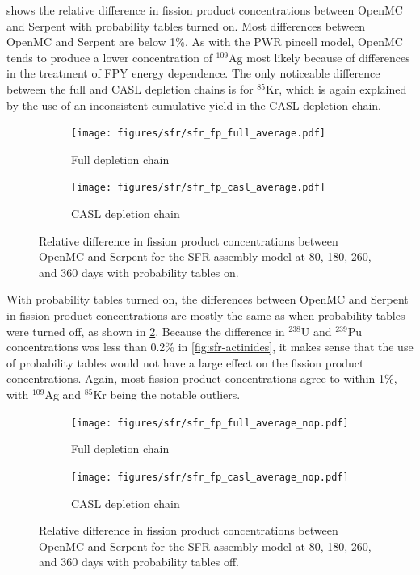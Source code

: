 \documentclass[3p,authoryear]{elsarticle}
\begin{document}
 shows the relative difference in fission product
concentrations between OpenMC and Serpent with probability tables turned on.
Most differences between OpenMC and Serpent are below 1\%. As with the PWR
pincell model, OpenMC tends to produce a lower concentration of $^{109}$Ag most
likely because of differences in the treatment of FPY energy dependence. The
only noticeable difference between the full and CASL depletion chains is for
$^{85}$Kr, which is again explained by the use of an inconsistent cumulative
yield in the CASL depletion chain.
\begin{figure}[H]
  \centering
  \begin{subfigure}[t]{0.45\textwidth}
    \texttt{[image: figures/sfr/sfr\_fp\_full\_average.pdf]}
    \caption{Full depletion chain}
  \end{subfigure}
  \hspace{0.05\textwidth}
  \begin{subfigure}[t]{0.45\textwidth}
    \texttt{[image: figures/sfr/sfr\_fp\_casl\_average.pdf]}
    \caption{CASL depletion chain}
  \end{subfigure}
  \caption{Relative difference in fission product concentrations between OpenMC
  and Serpent for the SFR assembly model at 80, 180, 260, and 360 days with
  probability tables on.}
  \label{fig:sfr-fp}
\end{figure}

With probability tables turned on, the differences between OpenMC and Serpent in
fission product concentrations are mostly the same as when probability tables
were turned off, as shown in \cref{fig:sfr-fp-nop}. Because the difference in
$^{238}$U and $^{239}$Pu concentrations was less than 0.2\% in
\cref{fig:sfr-actinides}, it makes sense that the use of probability tables
would not have a large effect on the fission product concentrations. Again, most
fission product concentrations agree to within 1\%, with $^{109}$Ag and
$^{85}$Kr being the notable outliers.
\begin{figure}[H]
  \centering
  \begin{subfigure}[t]{0.45\textwidth}
    \texttt{[image: figures/sfr/sfr\_fp\_full\_average\_nop.pdf]}
    \caption{Full depletion chain}
  \end{subfigure}
  \hspace{0.05\textwidth}
  \begin{subfigure}[t]{0.45\textwidth}
    \texttt{[image: figures/sfr/sfr\_fp\_casl\_average\_nop.pdf]}
    \caption{CASL depletion chain}
  \end{subfigure}
  \caption{Relative difference in fission product concentrations between OpenMC
  and Serpent for the SFR assembly model at 80, 180, 260, and 360 days with
  probability tables off.}
  \label{fig:sfr-fp-nop}
\end{figure}
\end{document}
